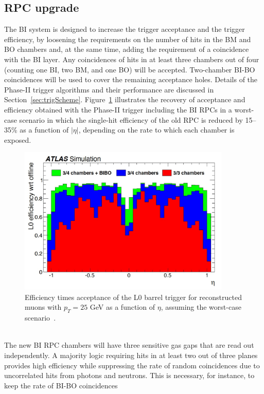 \subsection{RPC upgrade}
The BI system is designed to increase the trigger acceptance and the trigger efficiency, by
loosening the requirements on the number of hits in the BM and BO chambers and, at the
same time, adding the requirement of a coincidence with the BI layer. Any coincidences of
hits in at least three chambers out of four (counting one BI, two BM, and one BO) will be
accepted. Two-chamber BI-BO coincidences will be used to cover the remaining acceptance
holes. Details of the Phase-II trigger algorithms and their performance are discussed in
Section~\ref{sec:trigScheme}. Figure~\ref{fig:tdr_eff} illustrates the recovery of acceptance and 
efficiency obtained with the Phase-II trigger including the BI RPCs in a worst-case scenario in 
which the single-hit efficiency of the old RPC is reduced by 15–35\% as a function of $|\eta|$, 
depending on the rate to which each chamber is exposed.
\begin{figure}[!h]
	\centering
	\includegraphics[width=0.9\textwidth]{Chapters/CH3/figures/tdr_eff}
	\caption{Efficiency times acceptance of the L0 barrel trigger for reconstructed muons with $p_{T} =
     25$ GeV as a function of $\eta$, assuming the worst-case scenario~\cite{TDR}.}
	\label{fig:tdr_eff}
\end{figure}
\\The new BI RPC chambers will have three sensitive gas gaps that are read out independently.
A majority logic requiring hits in at least two out of three planes provides high efficiency
while suppressing the rate of random coincidences due to uncorrelated hits from
photons and neutrons. This is necessary, for instance, to keep the rate of BI-BO coincidences
